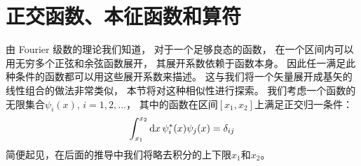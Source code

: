 \section{正交函数、本征函数和算符}
\label{sec:1.2}
由 Fourier 级数的理论我们知道，
对于一个足够良态的函数，
在一个区间内可以用无穷多个正弦和余弦函数展开，
其展开系数依赖于函数本身。
因此任一满足此种条件的函数都可以用这些展开系数来描述。
这与我们将一个矢量展开成基矢的线性组合的做法非常类似，
本节将对这种相似性进行探索。
我们考虑一个函数的无限集合$\psi_i(x),\,i = 1, 2, \dots$，
其中的函数在区间$\left[x_1, x_2\right]$上满足正交归一条件：
\begin{equation}
 \int_{x_1}^{x_2}\mathrm{d}x\,\psi_i^\ast(x)\psi_j(x) = \delta_{ij}
 \label{eq:1.116}
\end{equation}
简便起见，在后面的推导中我们将略去积分的上下限$x_1$和$x_2$。


